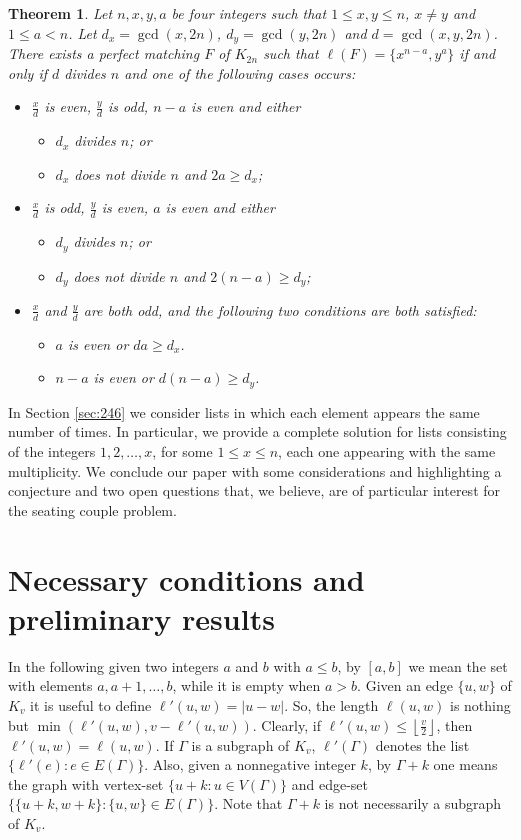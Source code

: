 \documentclass{amsart}
\def\G{\Gamma}
\newtheorem{thm}[defi]{Theorem}
\theoremstyle{definition}
\numberwithin{equation}{section}
\begin{document}
\begin{thm}\label{thm:1x}
Let $n, x, y, a$ be four integers such that $1\leq x,y\leq n$, $x\neq y$  and $1\leq a<n$.
Let $d_x=\gcd(x,2n)$, $d_y=\gcd(y,2n)$ and  $d=\gcd(x,y,2n)$.
There exists a perfect matching $F$ of $K_{2n}$ such that $\ell(F)=\{ x^{n-a}, y^a\}$ if and only if
$d$ divides $n$ and one of the following cases occurs:
\begin{itemize}
 \item[(1)] $\frac{x}{d}$ is even, $\frac{y}{d}$ is odd, $n-a$ is even  and  either
 \begin{itemize}
 \item[(a)] $d_x$ divides $n$; or
 \item[(b)] $d_x$ does not divide $n$ and  $2a \geq d_x$;
\end{itemize}
 \item[(2)] $\frac{x}{d}$ is odd, $\frac{y}{d}$ is even, $a$ is even  and  either
 \begin{itemize}
 \item[(a)] $d_y$ divides $n$; or
 \item[(b)] $d_y$ does not divide $n$ and  $2(n-a) \geq d_y$;
\end{itemize}
 \item[(3)]   $\frac{x}{d}$ and $\frac{y}{d}$ are both odd, and the following two conditions  are both satisfied:
\begin{itemize}
\item[(a)] $a$ is even or $da\geq d_x$.
\item[(b)] $n-a$ is even or $d(n-a)\geq d_y$.
\end{itemize}
\end{itemize}
\end{thm}

In Section \ref{sec:246} we consider lists in which each element appears the same number of times.
In particular, we provide a complete solution for lists consisting of the integers
$1,2,\ldots,x$, for some $1\leq x\leq n$, each one appearing with the same  multiplicity.
We conclude our paper with some considerations and highlighting a conjecture and two open questions that, we believe, are of
particular interest for the seating couple problem.


\section{Necessary conditions and preliminary results}\label{sec:preliminary}


In the following given two integers $a$ and $b$ with $a\leq b$, by $[a,b]$ we mean the set with elements $a,a+1,\ldots,b$,
while it is empty when $a > b$.
Given an edge $\{u,w\}$ of $K_v$ it is useful to define
$\ell'(u,w)=|u-w|$. So, the length $\ell(u,w)$ is nothing but $\min(\ell'(u,w), v-\ell'(u,w))$.
Clearly, if $\ell'(u,w)\leq \left\lfloor \frac{v}{2}\right\rfloor$, then $\ell'(u,w)=\ell(u,w)$.
If $\G$ is a subgraph of $K_v$, $\ell'(\G)$ denotes the list $\{\ell'(e) : e\in E(\G)\}$.
Also, given a nonnegative integer $k$,  by $\G+k$ one means the graph with
vertex-set $\{u+k : u \in V(\G)\}$ and edge-set
$\{\{u+k, w+k\}: \{u,w\}\in E(\G)\}$. Note that $\G+k$ is not necessarily a subgraph of $K_v$.
\end{document}
